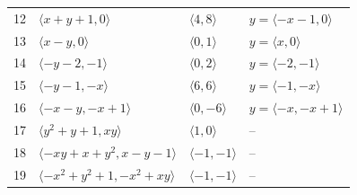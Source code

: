 \documentclass[11pt]{article}
\begin{document}
\begin{longtable}{@{}rlll@{}}
12 & $\langle x+y+1,0\rangle$ & $\langle 4,8\rangle$ & $y=\langle -x-1,0\rangle$\\
13 & $\langle x-y,0\rangle$ & $\langle 0,1\rangle$ & $y=\langle x,0\rangle$\\
14 & $\langle -y-2,-1\rangle$ & $\langle 0,2\rangle$ & $y=\langle -2,-1\rangle$\\
15 & $\langle -y-1,-x\rangle$ & $\langle 6,6\rangle$ & $y=\langle -1,-x\rangle$\\
16 & $\langle -x-y,-x+1\rangle$ & $\langle 0,-6\rangle$ & $y=\langle -x,-x+1\rangle$\\
17 & $\langle y^{2}+y+1,xy\rangle$ & $\langle 1,0\rangle$ & --\\
18 & $\langle -xy+x+y^{2},x-y-1\rangle$ & $\langle -1,-1\rangle$ & --\\
19 & $\langle -x^{2}+y^{2}+1,-x^{2}+xy\rangle$ & $\langle -1,-1\rangle$ & --\\
\end{longtable}
\endgroup
\end{document}

